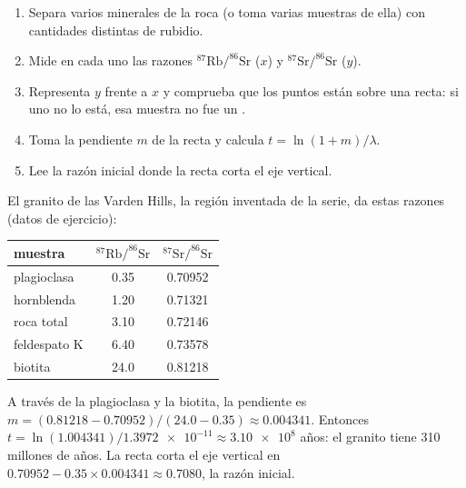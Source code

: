 \begin{method}\label{met:g12:age-of-the-earth:isochron}
\begin{enumerate}
  \item Separa varios minerales de la roca (o toma varias muestras de ella)
        con cantidades distintas de rubidio.
  \item Mide en cada uno las razones $^{87}\mathrm{Rb}/^{86}\mathrm{Sr}$ ($x$)
        y $^{87}\mathrm{Sr}/^{86}\mathrm{Sr}$ ($y$).
  \item Representa $y$ frente a $x$ y comprueba que los puntos están sobre una
        recta: si uno no lo está, esa muestra no fue un .
  \item Toma la pendiente $m$ de la recta y calcula $t = \ln(1+m)/\lambda$.
  \item Lee la razón inicial donde la recta corta el eje vertical.
\end{enumerate}
\end{method}

\begin{example}\label{ex:g12:age-of-the-earth:varden}
El granito de las Varden Hills, la región inventada de la serie, da estas
razones (datos de ejercicio):
\begin{center}
\small
\begin{tabular}{|l|c|c|}
\hline
muestra & $^{87}\mathrm{Rb}/^{86}\mathrm{Sr}$ & $^{87}\mathrm{Sr}/^{86}\mathrm{Sr}$ \\
\hline
plagioclasa & 0.35 & 0.70952 \\
hornblenda  & 1.20 & 0.71321 \\
roca total  & 3.10 & 0.72146 \\
feldespato K  & 6.40 & 0.73578 \\
biotita     & 24.0 & 0.81218 \\
\hline
\end{tabular}
\end{center}
A través de la plagioclasa y la biotita, la pendiente es
$m = (0.81218 - 0.70952)/(24.0 - 0.35) \approx 0.004341$. Entonces
$t = \ln(1.004341)/\num{1.3972e-11} \approx \num{3.10e8}$ años:
el granito tiene 310 millones de años. La recta corta el eje vertical en
$0.70952 - 0.35 \times 0.004341 \approx 0.7080$, la razón inicial.
\end{example}

